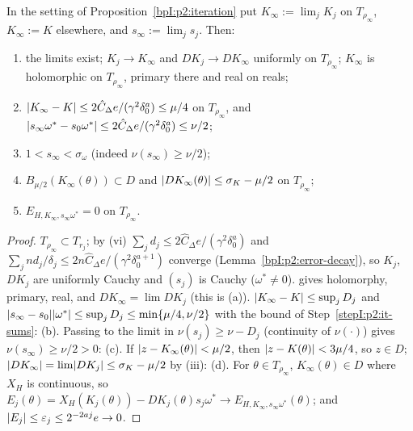 \begin{proposition}\label{bpI:p2:limit}
In the setting of Proposition~\ref{bpI:p2:iteration} put $K_\infty:=\lim_jK_j$ on $T_{\rho_\infty}$, $K_\infty:=K$ elsewhere, and $s_\infty:=\lim_js_j$. Then:
\begin{enumerate}[label=(\alph*)]
\item the limits exist; $K_j\to K_\infty$ and $DK_j\to DK_\infty$ uniformly on $T_{\rho_\infty}$; $K_\infty$ is holomorphic on $T_{\rho_\infty}$, primary there and real on reals;
\item $\lvert K_\infty-K\rvert\le2\hat C_\Delta e/(\gamma^2\delta_0^a)\le\mu/4$ on $T_{\rho_\infty}$, and $\lvert s_\infty\omega^*-s_0\omega^*\rvert\le2\hat C_\Delta e/(\gamma^2\delta_0^a)\le\nu/2$;
\item $1<s_\infty<\sigma_\omega$ (indeed $\nu(s_\infty)\ge\nu/2$);
\item $B_{\mu/2}(K_\infty(\theta))\subset D$ and $\lvert DK_\infty(\theta)\rvert\le\sigma_K-\mu/2$ on $T_{\rho_\infty}$;
\item $E_{H,K_\infty,s_\infty\omega^*}=0$ on $T_{\rho_\infty}$.
\end{enumerate}
\end{proposition}
\begin{proof}
\label{stepI:p2:lim-conv}
$T_{\rho_\infty}\subset T_{r_j}$; by (vi) $\sum_j d_j\le2\hat C_\Delta e/(\gamma^2\delta_0^{a})$ and $\sum_jnd_j/\delta_j\le2n\hat C_\Delta e/(\gamma^2\delta_0^{a+1})$ converge (Lemma~\ref{bpI:p2:error-decay}), so $K_j$, $DK_j$ are uniformly Cauchy and $(s_j)$ is Cauchy ($\omega^*\ne0$).  gives holomorphy, primary, real, and $DK_\infty=\lim DK_j$ (this is (a)).
\label{stepI:p2:lim-close}
$\lvert K_\infty-K\rvert\le\sup_jD_j$ and $\lvert s_\infty-s_0\rvert\lvert \omega^*\rvert\le\sup_jD_j\le\min\{\mu/4,\nu/2\}$ with the bound of Step~\ref{stepI:p2:it-sums}: (b). Passing to the limit in $\nu(s_j)\ge\nu-D_j$ (continuity of $\nu(\cdot)$) gives $\nu(s_\infty)\ge\nu/2>0$: (c).
\label{stepI:p2:lim-margins}
If $\lvert z-K_\infty(\theta)\rvert<\mu/2$, then $\lvert z-K(\theta)\rvert<3\mu/4$, so $z\in D$; $\lvert DK_\infty\rvert=\lim\lvert DK_j\rvert\le\sigma_K-\mu/2$ by (iii): (d).
\label{stepI:p2:lim-inv}
For $\theta\in T_{\rho_\infty}$, $K_\infty(\theta)\in D$ where $X_H$ is continuous, so $E_j(\theta)=X_H(K_j(\theta))-DK_j(\theta)s_j\omega^*\to E_{H,K_\infty,s_\infty\omega^*}(\theta)$; and $\lvert E_j\rvert\le\varepsilon_j\le2^{-2aj}e\to0$.
\end{proof}

